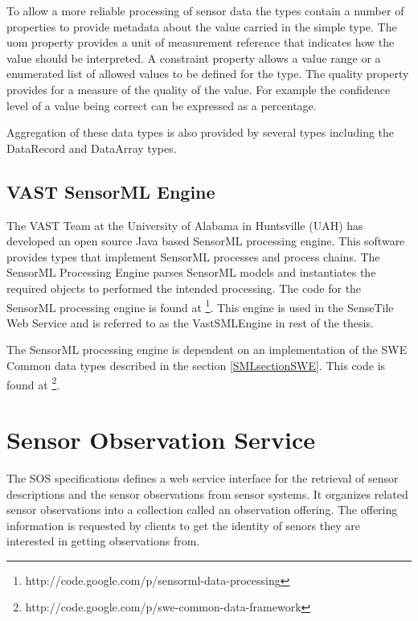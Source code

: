 \documentclass[]{final_report}
\begin{document}
To allow a more reliable processing of sensor data the types contain a number of properties to provide metadata about the value carried in the simple type. The uom property provides a unit of measurement reference that indicates how the value should be interpreted.  A constraint property allows a value range or a enumerated list of allowed values to be defined for the type. The quality property provides for a measure of the quality of the value.  For example the confidence level of a value being correct can be expressed as a percentage.

Aggregation of these data types is also provided by several types including the DataRecord and DataArray types.



\subsection{VAST SensorML Engine}\label{VastSensorMLEngineSec}
The VAST Team at the University of Alabama in Huntsville (UAH) has developed an open source Java based SensorML processing engine. This software provides types that implement SensorML processes and process chains. The SensorML Processing Engine parses SensorML models and instantiates the required objects to performed the intended processing. The code for the SensorML processing engine is found at \footnote{http://code.google.com/p/sensorml-data-processing}. This engine is used in the SenseTile Web Service and is referred to as the VastSMLEngine in rest of the thesis. 

The SensorML processing engine is dependent on an implementation of the SWE Common data types described in the section \ref{SMLsectionSWE}. This code is found at \footnote{http://code.google.com/p/swe-common-data-framework}.

\section{Sensor Observation Service}\label{SOSSec}
The SOS specifications defines a web service interface for the retrieval of sensor descriptions and the sensor observations from sensor systems. It organizes related sensor observations into a collection called an observation offering. The offering information is requested by clients to get the identity of senors they are interested in getting observations from.
\end{document}
